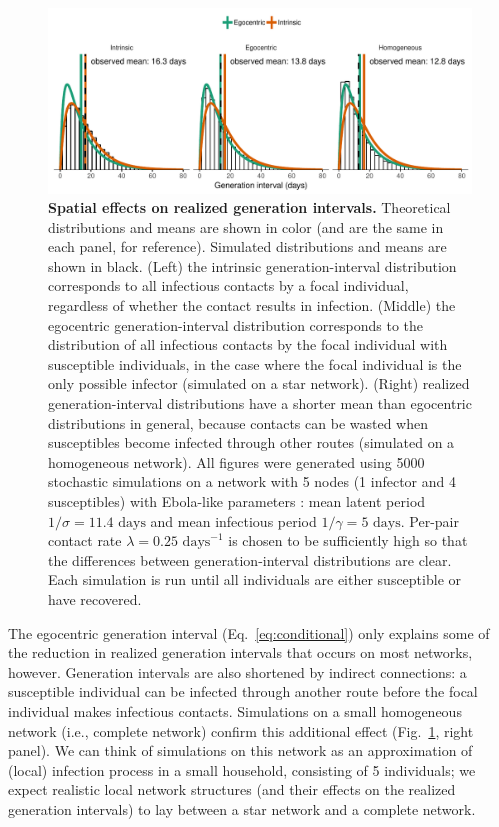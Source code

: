 \documentclass[12pt]{article}
\newcommand{\eref}[1]{Eq.~\ref{eq:#1}}
\newcommand{\fref}[1]{Fig.~\ref{fig:#1}}
\begin{document}
\begin{figure}[!ht]
\includegraphics[width=\textwidth]{local_effect.pdf}
\caption{
\textbf{Spatial effects on realized generation intervals.}
Theoretical distributions and means are shown in color (and are the same in each panel, for reference). Simulated distributions and means are shown in black.
(Left) the intrinsic generation-interval distribution corresponds to all infectious contacts by a focal individual, regardless of whether the contact results in infection.
(Middle) the egocentric generation-interval distribution corresponds to the distribution of all infectious contacts by the focal individual with susceptible individuals, in the case where the focal individual is the only possible infector (simulated on a star network).
(Right) realized generation-interval distributions have a shorter mean than egocentric distributions in general, because contacts can be wasted when susceptibles become infected through other routes (simulated on a homogeneous network).
All figures were generated using 5000 stochastic simulations on a network with 5 nodes (1 infector and 4 susceptibles) with Ebola-like parameters \citep{who2014ebola}:
mean latent period $1/\sigma = 11.4 \textrm{ days}$ and mean infectious period $1/\gamma = 5 \textrm{ days}$. 
Per-pair contact rate $\lambda = 0.25 \textrm{ days}^{-1}$ is chosen to be sufficiently high so that the differences between generation-interval distributions are clear.
Each simulation is run until all individuals are either susceptible or have recovered.
}
\label{fig:local}
\end{figure}

The egocentric generation interval (\eref{conditional}) only explains some of the reduction in realized generation intervals that occurs on most networks, however.
Generation intervals are also shortened by indirect connections: a susceptible individual can be infected through another route before the focal individual makes infectious contacts.
Simulations on a small homogeneous network (i.e., complete network) confirm this additional effect (\fref{local}, right panel). 
We can think of simulations on this network as an approximation of (local) infection process in a small household, consisting of 5 individuals;
we expect realistic local network structures (and their effects on the realized generation intervals) to lay between a star network and a complete network.
\end{document}

